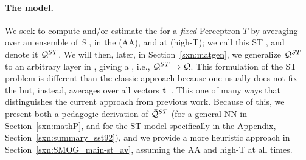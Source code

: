 \paragraph{The \StudentTeacher model.}
We seek to compute and/or estimate the  \AverageGeneralizationAccuracy for a \emph{fixed} \Teacher Perceptron $T$
by averaging over an ensemble of \Student $S$ \Perceptrons, in the \AnnealedApproximation (AA), and at
\HighTemperature (high-T); we call this ST \ModelQuality, and denote it $\bar{\mathcal{Q}}^{ST}$.
We will then, later, in Section~\ref{sxn:matgen}, we generalize $\bar{\mathcal{Q}}^{ST}$ to an
arbitrary layer in \MultiLayerPerceptron, giving a \LayerQuality, i.e., $\bar{\mathcal{Q}}^{ST}\rightarrow\bar{\mathcal{Q}}$.
This formulation of the ST problem is different than the classic approach  because one
usually does not fix the \Teacher but, instead,
averages over all \Teacher vectors ${\mathbf{t}}$~\cite{SST92,engel2001statistical}.
This one of many ways that distinguishes the current approach from previous work.
Because of this, we present both a pedagogic derivation of $\bar{\mathcal{Q}}^{ST}$
(for a general NN in Section~\ref{sxn:mathP}, and for the ST model specifically
in the Appendix, Section~\ref{sxn:summary_sst92}),
and we provide a more heuristic approach in Section~\ref{sxn:SMOG_main-st_av}, assuming
the AA and high-T at all times.

